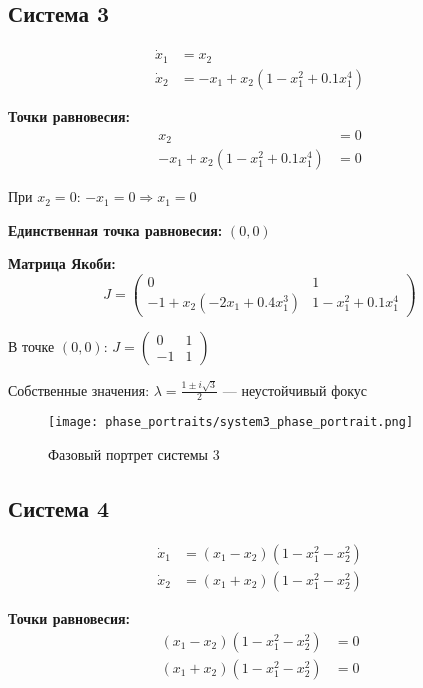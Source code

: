 \subsection*{Система 3}

\begin{align}
\dot{x}_1 &= x_2 \\
\dot{x}_2 &= -x_1 + x_2(1 - x_1^2 + 0.1x_1^4)
\end{align}

\textbf{Точки равновесия:}
\begin{align}
x_2 &= 0 \\
-x_1 + x_2(1 - x_1^2 + 0.1x_1^4) &= 0
\end{align}

При $x_2 = 0$: $-x_1 = 0 \Rightarrow x_1 = 0$

\textbf{Единственная точка равновесия:} $(0, 0)$

\textbf{Матрица Якоби:}
$$J = \begin{pmatrix} 0 & 1 \\ -1 + x_2(-2x_1 + 0.4x_1^3) & 1 - x_1^2 + 0.1x_1^4 \end{pmatrix}$$

В точке $(0, 0)$: $J = \begin{pmatrix} 0 & 1 \\ -1 & 1 \end{pmatrix}$

Собственные значения: $\lambda = \frac{1 \pm i\sqrt{3}}{2}$ --- неустойчивый фокус

\begin{figure}[H]
\centering
\texttt{[image: phase\_portraits/system3\_phase\_portrait.png]}
\caption{Фазовый портрет системы 3}
\label{fig:system3_phase_portrait}
\end{figure}

\subsection*{Система 4}

\begin{align}
\dot{x}_1 &= (x_1 - x_2)(1 - x_1^2 - x_2^2) \\
\dot{x}_2 &= (x_1 + x_2)(1 - x_1^2 - x_2^2)
\end{align}

\textbf{Точки равновесия:}
\begin{align}
(x_1 - x_2)(1 - x_1^2 - x_2^2) &= 0 \\
(x_1 + x_2)(1 - x_1^2 - x_2^2) &= 0
\end{align}

